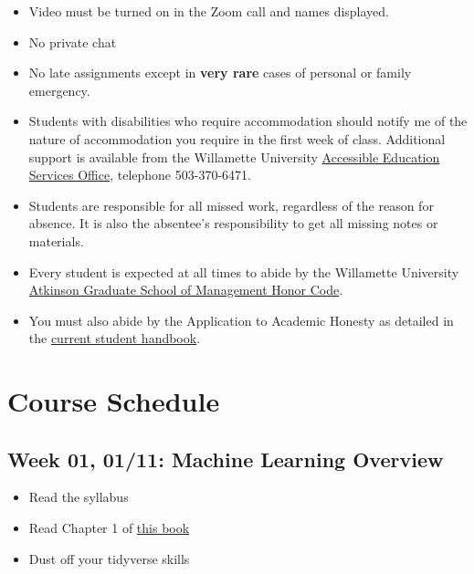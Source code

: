 \documentclass[11pt,]{article}
\providecommand{\tightlist}{%
  \setlength{\itemsep}{0pt}\setlength{\parskip}{0pt}}
\begin{document}
\begin{itemize}
\tightlist
\item
  Video must be turned on in the Zoom call and names displayed.
\item
  No private chat
\item
  No late assignments except in \textbf{very rare} cases of personal or
  family emergency.
\item
  Students with disabilities who require accommodation should notify me
  of the nature of accommodation you require in the first week of class.
  Additional support is available from the Willamette University
  \href{www.willamette.edu/dept/disability}{Accessible Education
  Services Office}, telephone 503-370-6471.
\item
  Students are responsible for all missed work, regardless of the reason
  for absence. It is also the absentee's responsibility to get all
  missing notes or materials.
\item
  Every student is expected at all times to abide by the Willamette
  University
  \href{http://www.willamette.edu/mba/about/honorcode}{Atkinson Graduate
  School of Management Honor Code}.

  \item

  You must also abide by the Application to Academic Honesty as detailed
  in the
  \href{http://www.willamette.edu/mba/students/student-handbook}{current
  student handbook}.
\end{itemize}

\newpage

\hypertarget{course-schedule}{%
\section{Course Schedule}\label{course-schedule}}

\hypertarget{week-01-0111-machine-learning-overview}{%
\subsection{Week 01, 01/11: Machine Learning
Overview}\label{week-01-0111-machine-learning-overview}}

\begin{itemize}
\tightlist
\item
  Read the syllabus
\item
  Read Chapter 1 of
  \href{https://srdas.github.io/MLBook/DataScience.html}{this book}
\item
  Dust off your tidyverse skills
\end{itemize}
\end{document}
